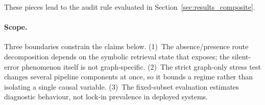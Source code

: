 These pieces lead to the audit rule evaluated in
Section~\ref{sec:results_composite}.

\paragraph{Scope.}
Three boundaries constrain the claims below.
(1)~The absence/presence route decomposition depends on the symbolic retrieval
state that \system{} exposes; the silent-error phenomenon itself is not
graph-specific.
(2)~The strict graph-only stress test changes several pipeline components at
once, so it bounds a regime rather than isolating a single causal variable.
(3)~The fixed-subset evaluation estimates diagnostic behaviour, not lock-in
prevalence in deployed systems.
